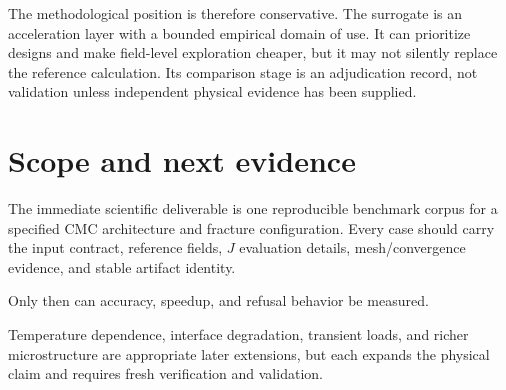 \documentclass[11pt]{article}
\begin{document}
The methodological position is therefore conservative.  The surrogate is an
acceleration layer with a bounded empirical domain of use.  It can prioritize
designs and make field-level exploration cheaper, but it may not silently
replace the reference calculation.  Its comparison stage is an adjudication
record, not validation unless independent physical evidence has been supplied.

\section{Scope and next evidence}

The immediate scientific deliverable is one reproducible benchmark corpus for a
specified CMC architecture and fracture configuration.  Every case should carry
the input contract, reference fields, $J$ evaluation details, mesh/convergence
evidence, and stable artifact identity.

Only then can accuracy, speedup, and
refusal behavior be measured.

Temperature dependence, interface degradation,
transient loads, and richer microstructure are appropriate later extensions, but
each expands the physical claim and requires fresh verification and validation.



\end{document}
